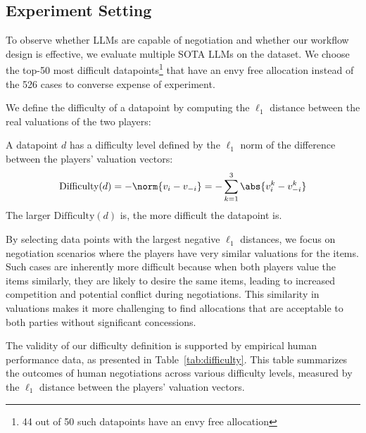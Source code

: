 \subsection{Experiment Setting}
To observe whether LLMs are capable of negotiation and whether our workflow design is effective, we evaluate multiple SOTA LLMs on the dataset. We choose the top-50 most difficult datapoints\footnote{44 out of 50 such datapoints have an envy free allocation} that have an envy free allocation instead of the 526 cases to converse expense of experiment. 


We define the difficulty of a datapoint by computing the $\ell_1$ distance between the real valuations of the two players:
\begin{definition}[Difficulty]
A datapoint $d$ has a difficulty level defined by the $\ell_1$ norm of the difference between the players' valuation vectors: 
$$\text{Difficulty}(d) = -\norm{v_{i}-v_{-i}} = -\sum\limits_{k=1}^3\abs{v_i^k - v_{-i}^k}$$ The larger $\text{Difficulty}(d)$ is, the more difficult the datapoint is.
\end{definition}

By selecting data points with the largest negative $\ell_1$ distances, we focus on negotiation scenarios where the players have very similar valuations for the items. Such cases are inherently more difficult because when both players value the items similarly, they are likely to desire the same items, leading to increased competition and potential conflict during negotiations. This similarity in valuations makes it more challenging to find allocations that are acceptable to both parties without significant concessions. 

The validity of our difficulty definition is supported by empirical human performance data, as presented in Table~\ref{tab:difficulty}. This table summarizes the outcomes of human negotiations across various difficulty levels, measured by the $\ell_1$ distance between the players' valuation vectors.

